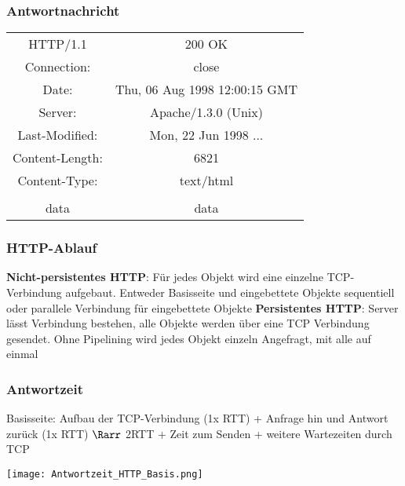 		\subsubsection{Antwortnachricht}
			\begin{center}
				\begin{tabular}{|cc|}
					\hline
					HTTP/1.1 & 200 OK \\
					Connection: & close \\
					Date: & Thu, 06 Aug 1998 12:00:15 GMT \\
					Server: & Apache/1.3.0 (Unix) \\
					Last-Modified: & Mon, 22 Jun 1998 ... \\
					Content-Length: & 6821 \\
					Content-Type: & text/html \\
					& \\
					data & data \\
					\hline
				\end{tabular}
			\end{center}
		\subsubsection{HTTP-Ablauf}
			\textbf{Nicht-persistentes HTTP}: \newline
				Für jedes Objekt wird eine einzelne TCP-Verbindung aufgebaut. Entweder Basisseite und eingebettete Objekte sequentiell oder parallele Verbindung für eingebettete Objekte
				\newline \newline
			\textbf{Persistentes HTTP}: \newline
				Server lässt Verbindung bestehen, alle Objekte werden über eine TCP Verbindung gesendet. Ohne Pipelining wird jedes Objekt einzeln Angefragt, mit alle auf einmal
			
		\subsubsection{Antwortzeit}
			Basisseite: Aufbau der TCP-Verbindung (1x RTT) + Anfrage hin und Antwort zurück (1x RTT) $\Rarr$ 2RTT + Zeit zum Senden + weitere Wartezeiten durch TCP \newline
			\begin{center}
				\texttt{[image: Antwortzeit\_HTTP\_Basis.png]}	
			\end{center}
